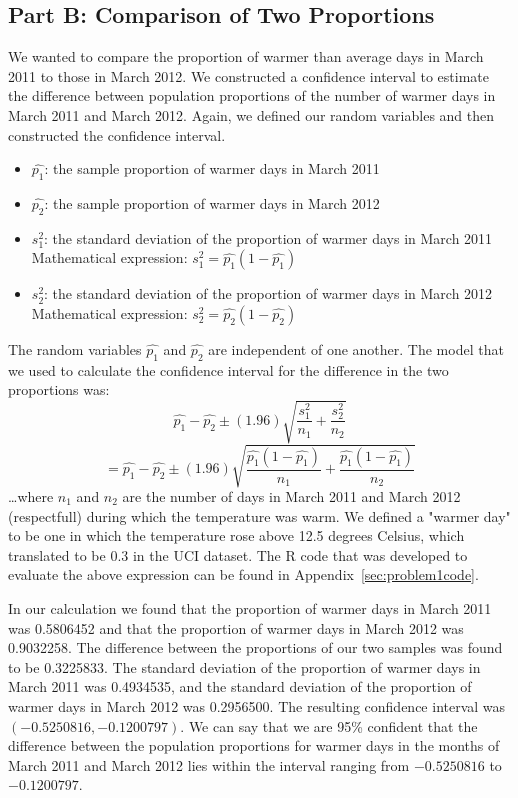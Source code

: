 \documentclass[11pt]{article}
\begin{document}
\subsection{Part B: Comparison of Two Proportions}
\label{subsec:1b}
We wanted to compare the proportion of warmer than average days in March 2011 to those in March 2012. We constructed a confidence interval to estimate the difference between population proportions of the number of warmer days in March 2011 and March 2012. Again, we defined our random variables and then constructed the confidence interval. 
\begin{itemize}
	\item $\hat{p_1}$: the sample proportion of warmer days in March 2011
	\item $\hat{p_2}$: the sample proportion of warmer days in March 2012
	\item $s_{1}^{2}$: the standard deviation of the proportion of warmer days in March 2011
		\subitem Mathematical expression: $s_{1}^{2} =\hat{p_1}(1 - \hat{p_1})$
	\item $s_{2}^{2}$: the standard deviation of the proportion of warmer days in March 2012
		\subitem Mathematical expression: $s_{2}^{2} = \hat{p_2}(1 - \hat{p_2})$
\end{itemize}
The random variables $\hat{p_1}$ and $\hat{p_2}$ are independent of one another. The model that we used to calculate the confidence interval for the difference in the two proportions was:
\begin{equation}
\hat{p_1} - \hat{p_2} \pm (1.96) \sqrt{\frac{s_1^2}{n_1}+\frac{s_2^2}{n_2}} 
\end{equation}
\begin{equation}
= \hat{p_1} - \hat{p_2} \pm (1.96) \sqrt{\frac{\hat{p_1}(1 - \hat{p_1})}{n_1}+\frac{\hat{p_1}(1 - \hat{p_1})}{n_2}}
\end{equation}
\dots where $n_1$ and $n_2$ are the number of days in March 2011 and March 2012 (respectfull) during which the temperature was warm. We defined a "warmer day" to be one in which the temperature rose above 12.5 degrees Celsius, which translated to be 0.3 in the UCI dataset. The R code that was developed to evaluate the above expression can be found in Appendix~\ref{sec:problem1code}.

In our calculation we found that the proportion of warmer days in March 2011 was 0.5806452 and that the proportion of warmer days in March 2012 was 0.9032258. The difference between the proportions of our two samples was found to be 0.3225833. The standard deviation of the proportion of warmer days in March 2011 was 0.4934535, and the standard deviation of the proportion of warmer days in March 2012 was 0.2956500. The resulting confidence interval was $(-0.5250816, -0.1200797)$. We can say that we are 95\% confident that the difference between the population proportions for warmer days in the months of March 2011 and March 2012 lies within the interval ranging from $-0.5250816$ to  $-0.1200797$.
\end{document}
